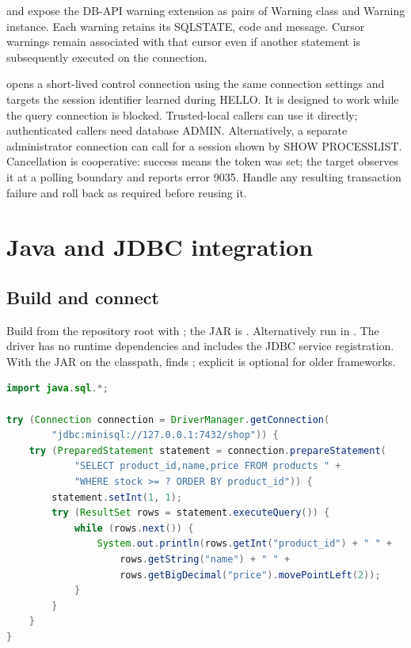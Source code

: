  and  expose the DB-API warning
extension as pairs of Warning class and Warning instance. Each warning retains
its SQLSTATE, code and message. Cursor warnings remain associated with that
cursor even if another statement is subsequently executed on the connection.

 opens a short-lived control connection using the same connection settings and targets the session identifier learned during HELLO. It is designed to work while the query connection is blocked. Trusted-local callers can use it directly; authenticated callers need database ADMIN. Alternatively, a separate administrator connection can call  for a session shown by SHOW PROCESSLIST. Cancellation is cooperative: success means the token was set; the target observes it at a polling boundary and reports error 9035. Handle any resulting transaction failure and roll back as required before reusing it.


\section{Java and JDBC integration}
\subsection{Build and connect}

Build from the repository root with ; the JAR is . Alternatively run  in . The driver has no runtime dependencies and includes the JDBC service registration. With the JAR on the classpath,  finds ; explicit  is optional for older frameworks.

\begin{lstlisting}[language=Java]
import java.sql.*;

try (Connection connection = DriverManager.getConnection(
        "jdbc:minisql://127.0.0.1:7432/shop")) {
    try (PreparedStatement statement = connection.prepareStatement(
            "SELECT product_id,name,price FROM products " +
            "WHERE stock >= ? ORDER BY product_id")) {
        statement.setInt(1, 1);
        try (ResultSet rows = statement.executeQuery()) {
            while (rows.next()) {
                System.out.println(rows.getInt("product_id") + " " +
                    rows.getString("name") + " " +
                    rows.getBigDecimal("price").movePointLeft(2));
            }
        }
    }
}
\end{lstlisting}

